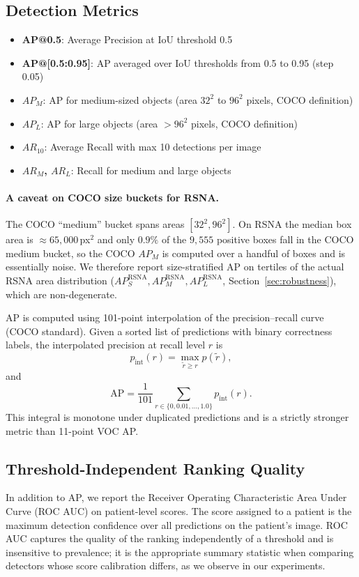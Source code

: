 \documentclass[11pt,a4paper]{article}
\begin{document}
\subsection{Detection Metrics}
\begin{itemize}[nosep]
    \item \textbf{AP@0.5}: Average Precision at IoU threshold 0.5
    \item \textbf{AP@[0.5:0.95]}: AP averaged over IoU thresholds from 0.5 to 0.95 (step 0.05)
    \item \textbf{$AP_M$}: AP for medium-sized objects (area $32^2$ to $96^2$ pixels, COCO definition)
    \item \textbf{$AP_L$}: AP for large objects (area $>96^2$ pixels, COCO definition)
    \item \textbf{$AR_{10}$}: Average Recall with max 10 detections per image
    \item \textbf{$AR_M$, $AR_L$}: Recall for medium and large objects
\end{itemize}

\paragraph{A caveat on COCO size buckets for RSNA.}
The COCO ``medium'' bucket spans areas $[32^2, 96^2]$. On RSNA the median box area is $\approx 65{,}000$\,px$^2$ and only $0.9\%$ of the $9{,}555$ positive boxes fall in the COCO medium bucket, so the COCO $AP_M$ is computed over a handful of boxes and is essentially noise. We therefore report size-stratified AP on tertiles of the actual RSNA area distribution ($AP_S^{\text{RSNA}}, AP_M^{\text{RSNA}}, AP_L^{\text{RSNA}}$, Section~\ref{sec:robustness}), which are non-degenerate.

AP is computed using 101-point interpolation of the precision--recall curve (COCO standard). Given a sorted list of predictions with binary correctness labels, the interpolated precision at recall level $r$ is
\begin{equation}
    p_{\text{int}}(r) = \max_{\tilde r \ge r} p(\tilde r),
\end{equation}
and
\begin{equation}
    \mathrm{AP} = \frac{1}{101} \sum_{r \in \{0, 0.01, \dots, 1.0\}} p_{\text{int}}(r).
\end{equation}
This integral is monotone under duplicated predictions and is a strictly stronger metric than 11-point VOC AP.

\subsection{Threshold-Independent Ranking Quality}
In addition to AP, we report the Receiver Operating Characteristic Area Under Curve (ROC AUC) on patient-level scores. The score assigned to a patient is the maximum detection confidence over all predictions on the patient's image. ROC AUC captures the quality of the ranking independently of a threshold and is insensitive to prevalence; it is the appropriate summary statistic when comparing detectors whose score calibration differs, as we observe in our experiments.
\end{document}
